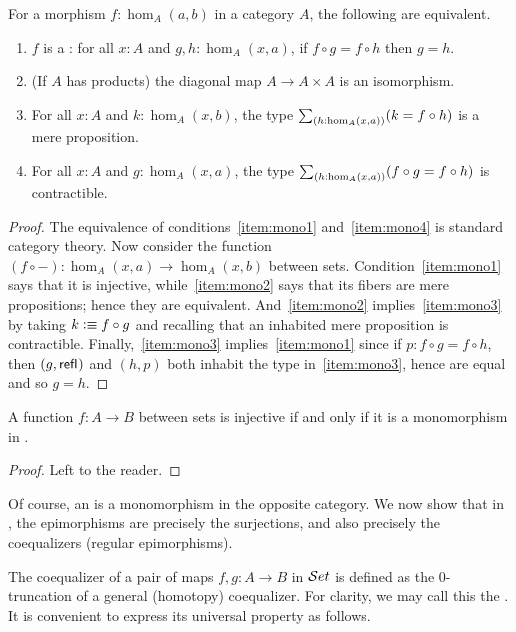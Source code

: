 \begin{lem}\label{thm:mono}
  For a morphism $f:\hom_A(a,b)$ in a category $A$, the following are equivalent.
  \begin{enumerate}
  \item $f$ is a : for all $x:A$ and ${g,h:\hom_A(x,a)}$, if $f\circ g = f\circ h$ then $g=h$.\label{item:mono1}
  \item (If $A$ has products) the diagonal map $A\to A\times A$ is an isomorphism.\label{item:mono4}
  \item For all $x:A$ and $k:\hom_A(x,b)$, the type $\sm{h:\hom_A(x,a)} (k = f\circ h)$ is a mere proposition.\label{item:mono2}
  \item For all $x:A$ and ${g:\hom_A(x,a)}$, the type $\sm{h:\hom_A(x,a)} (f\circ g = f\circ h)$ is contractible.\label{item:mono3}
  \end{enumerate}
\end{lem}
\begin{proof}
  The equivalence of conditions~\ref{item:mono1} and~\ref{item:mono4} is standard category theory.
  Now consider the function $(f\circ -):\hom_A(x,a) \to \hom_A(x,b)$ between sets.
  Condition~\ref{item:mono1} says that it is injective, while~\ref{item:mono2} says that its fibers are mere propositions; hence they are equivalent.
  And~\ref{item:mono2} implies~\ref{item:mono3} by taking $k\vcentcolon\equiv f\circ g$ and recalling that an inhabited mere proposition is contractible.
  Finally,~\ref{item:mono3} implies~\ref{item:mono1} since if $p:f\circ g= f\circ h$, then $(g,\mathsf{refl}_{})$ and $(h,p)$ both inhabit the type in~\ref{item:mono3}, hence are equal and so $g=h$.
\end{proof}

\begin{lem}
  A function $f:A\to B$ between sets is injective if and only if it is a monomorphism in \uset.
\end{lem}
\begin{proof}
  Left to the reader.
\end{proof}

Of course, an  is a monomorphism in the opposite category.
We now show that in \uset, the epimorphisms are precisely the surjections, and also precisely the coequalizers (regular epimorphisms).

The coequalizer of a pair of maps $f,g:A\to B$ in $\mathcal{S}et$ is defined as the 0-truncation of a general (homotopy) coequalizer.
For clarity, we may call this the .
It is convenient to express its universal property as follows.

